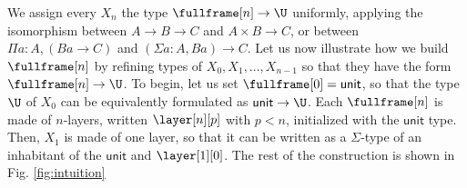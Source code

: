 \documentclass[10pt]{art.cls/art}
\newcommand{\unittype}{\ensuremath{\mathsf{unit}}}
\begin{document}
We assign every $X_n$ the type $\fullframe[n] \rightarrow \U$ uniformly, applying the isomorphism between $A \rightarrow B \rightarrow C$ and $A \times B \rightarrow C$, or between $\Pi a : A, (B a \rightarrow C)$ and $(\Sigma a : A, B a) \rightarrow C$. Let us now illustrate how we build $\fullframe[n]$ by refining types of $X_0, X_1, \ldots, X_{n - 1}$ so that they have the form $\fullframe[n] \rightarrow \U$. To begin, let us set $\fullframe[0] = \unittype$, so that the type $\U$ of $X_0$ can be equivalently formulated as $\unittype \rightarrow \U$. Each $\fullframe[n]$ is made of $n$-layers, written $\layer[n][p]$ with $p < n$, initialized with the $\unittype$ type. Then, $X_1$ is made of one layer, so that it can be written as a $\Sigma$-type of an inhabitant of the $\unittype$ and $\layer[1][0]$. The rest of the construction is shown in Fig. \ref{fig:intuition}
\end{document}
